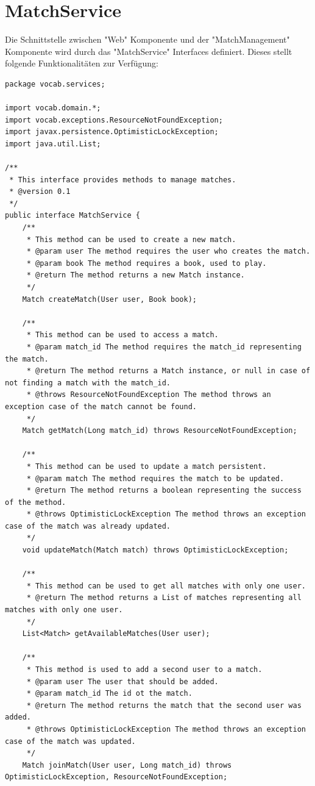 \section*{MatchService}
Die Schnittstelle zwischen "Web" Komponente und der "MatchManagement" Komponente wird durch das "MatchService" Interfaces definiert. Dieses stellt folgende Funktionalitäten zur Verfügung:
\begin{lstlisting}
package vocab.services;

import vocab.domain.*;
import vocab.exceptions.ResourceNotFoundException;
import javax.persistence.OptimisticLockException;
import java.util.List;

/**
 * This interface provides methods to manage matches.
 * @version 0.1
 */
public interface MatchService {
    /**
     * This method can be used to create a new match.
     * @param user The method requires the user who creates the match.
     * @param book The method requires a book, used to play.
     * @return The method returns a new Match instance.
     */
    Match createMatch(User user, Book book);

    /**
     * This method can be used to access a match.
     * @param match_id The method requires the match_id representing the match.
     * @return The method returns a Match instance, or null in case of not finding a match with the match_id.
     * @throws ResourceNotFoundException The method throws an exception case of the match cannot be found.
     */
    Match getMatch(Long match_id) throws ResourceNotFoundException;

    /**
     * This method can be used to update a match persistent.
     * @param match The method requires the match to be updated.
     * @return The method returns a boolean representing the success of the method.
     * @throws OptimisticLockException The method throws an exception case of the match was already updated.
     */
    void updateMatch(Match match) throws OptimisticLockException;

    /**
     * This method can be used to get all matches with only one user.
     * @return The method returns a List of matches representing all matches with only one user.
     */
    List<Match> getAvailableMatches(User user);

    /**
     * This method is used to add a second user to a match.
     * @param user The user that should be added.
     * @param match_id The id ot the match.
     * @return The method returns the match that the second user was added.
     * @throws OptimisticLockException The method throws an exception case of the match was updated.
     */
    Match joinMatch(User user, Long match_id) throws OptimisticLockException, ResourceNotFoundException;


\end{lstlisting}
